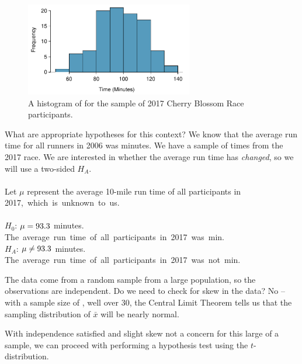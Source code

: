 \begin{figure}[h]
\centering
\includegraphics[width=0.65\textwidth]{ch_inference_for_means/figures/run10SampTimeHistogram/run17SampTimeHistogram} 
\caption{A histogram of  for the sample of 2017 Cherry Blossom Race participants.}
\label{run17SampTimeHistogram}
\end{figure}


\begin{examplewrap}
\begin{nexample}
{What are appropriate hypotheses for this context?}
We know that the average run time for all runners in 2006 was \cherryblossomnull{} minutes.  We have a sample of times from the 2017 race.  We are interested in whether the average run time has \emph{changed}, so we will use a two-sided $H_A$.\\
\\
Let $\mu$ represent the average 10-mile run time of all participants in 2017,\mbox{ which is unknown to us.}
\\
\\
$H_0$: $\mu = 93.3{}$ minutes. \mbox{The average run time of all participants in 2017 was \cherryblossomnull{} min.}
\\$H_A$: $\mu \neq 93.3{}$ minutes. \mbox{The average run time of all participants in 2017 was not \cherryblossomnull{} min.}
\end{nexample}
\end{examplewrap}

The data come from a random sample from a large population, so the observations are independent. Do we need to check for skew in the data? No -- with a sample size of \cherryblossomn{}, well over 30, the Central Limit Theorem tells us that the sampling distribution of $\bar{x}$ will be nearly normal.

With independence satisfied and slight skew not a concern for this large of a sample, we can proceed with performing a hypothesis test using the $t$-distribution.

